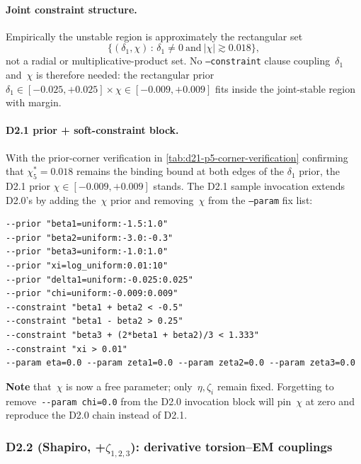 \paragraph{Joint constraint structure.}
Empirically the unstable region is approximately the rectangular set
\begin{equation*}
  \{(\delta_1,\chi)\,:\,\delta_1 \ne 0\ \text{and}\ |\chi| \gtrsim 0.018\},
\end{equation*}
not a radial or multiplicative-product set.  No \texttt{--constraint}
clause coupling~$\delta_1$ and~$\chi$ is therefore needed: the
rectangular prior $\delta_1 \in [-0.025, +0.025] \times \chi \in
[-0.009, +0.009]$ fits inside the joint-stable region with margin.

\paragraph{D2.1 prior + soft-constraint block.}
With the prior-corner verification in \cref{tab:d21-p5-corner-verification}
confirming that $\chi^*_5 = 0.018$ remains the binding bound at both
edges of the $\delta_1$ prior, the D2.1 prior $\chi \in [-0.009,
+0.009]$ stands.  The D2.1 sample invocation extends D2.0's by adding
the~$\chi$ prior and removing~$\chi$ from the \texttt{--param} fix list:
\begin{lstlisting}[basicstyle=\ttfamily\small]
--prior "beta1=uniform:-1.5:1.0"
--prior "beta2=uniform:-3.0:-0.3"
--prior "beta3=uniform:-1.0:1.0"
--prior "xi=log_uniform:0.01:10"
--prior "delta1=uniform:-0.025:0.025"
--prior "chi=uniform:-0.009:0.009"
--constraint "beta1 + beta2 < -0.5"
--constraint "beta1 - beta2 > 0.25"
--constraint "beta3 + (2*beta1 + beta2)/3 < 1.333"
--constraint "xi > 0.01"
--param eta=0.0 --param zeta1=0.0 --param zeta2=0.0 --param zeta3=0.0
\end{lstlisting}
\textbf{Note} that~$\chi$ is now a free parameter; only~$\eta,\zeta_i$
remain fixed.  Forgetting to remove~\verb|--param chi=0.0| from the
D2.0 invocation block will pin~$\chi$ at zero and reproduce the
D2.0 chain instead of D2.1.

\subsubsection*{D2.2 (Shapiro, +$\zeta_{1,2,3}$): derivative torsion--EM couplings}
\label{sec:d22-priors}

